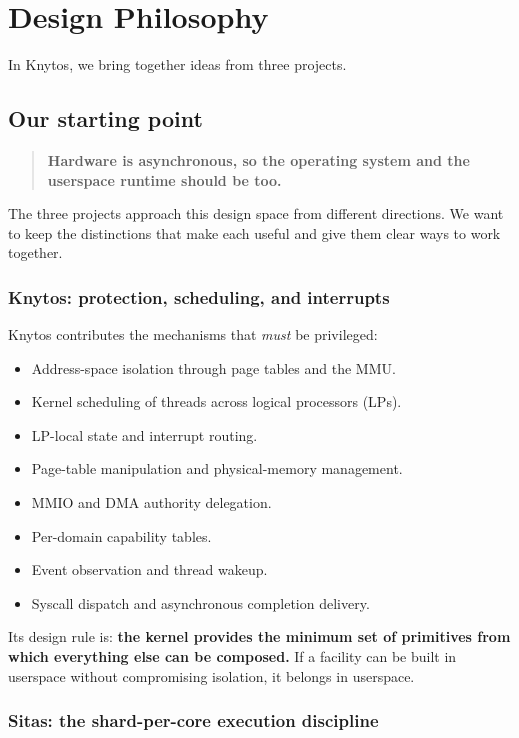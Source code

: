 \chapter{Design Philosophy}
\label{chap:design-philosophy}

In Knytos, we bring together ideas from three projects.

\section{Our starting point}

\begin{quote}
\textbf{Hardware is asynchronous, so the operating system and the userspace runtime
should be too.}
\end{quote}

The three projects approach this design space from different directions. We
want to keep the distinctions that make each useful and give them clear ways
to work together.

\subsection{Knytos: protection, scheduling, and interrupts}

Knytos contributes the mechanisms that \emph{must} be privileged:

\begin{itemize}
    \item Address-space isolation through page tables and the MMU.
    \item Kernel scheduling of threads across logical processors (LPs).
    \item LP-local state and interrupt routing.
    \item Page-table manipulation and physical-memory management.
    \item MMIO and DMA authority delegation.
    \item Per-domain capability tables.
    \item Event observation and thread wakeup.
    \item Syscall dispatch and asynchronous completion delivery.
\end{itemize}

Its design rule is: \textbf{the kernel provides the minimum set of primitives from
which everything else can be composed.} If a facility can be built in userspace
without compromising isolation, it belongs in userspace.

\subsection{Sitas: the shard-per-core execution discipline}

